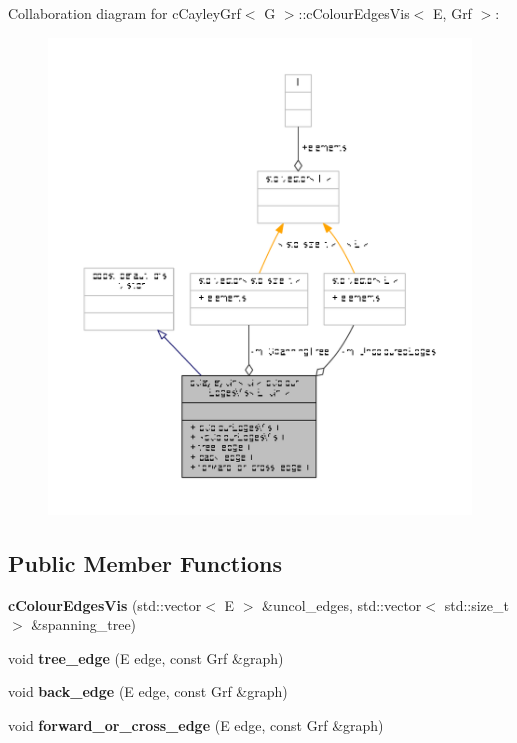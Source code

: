 Collaboration diagram for c\-Cayley\-Grf$<$ G $>$\-:\-:c\-Colour\-Edges\-Vis$<$ E, Grf $>$\-:
\nopagebreak
\begin{figure}[H]
\begin{center}
\leavevmode
\includegraphics[width=350pt]{classcCayleyGrf_1_1cColourEdgesVis__coll__graph}
\end{center}
\end{figure}
\subsection*{Public Member Functions}
\begin{DoxyCompactItemize}
\item 
\hypertarget{classcCayleyGrf_1_1cColourEdgesVis_a3a0757b2a0d975cdcd9f933eb6b11077}{{\bfseries c\-Colour\-Edges\-Vis} (std\-::vector$<$ E $>$ \&uncol\-\_\-edges, std\-::vector$<$ std\-::size\-\_\-t $>$ \&spanning\-\_\-tree)}\label{classcCayleyGrf_1_1cColourEdgesVis_a3a0757b2a0d975cdcd9f933eb6b11077}

\item 
\hypertarget{classcCayleyGrf_1_1cColourEdgesVis_a6943930a8499e2dc40c1ff8d389e6aa2}{void {\bfseries tree\-\_\-edge} (E edge, const Grf \&graph)}\label{classcCayleyGrf_1_1cColourEdgesVis_a6943930a8499e2dc40c1ff8d389e6aa2}

\item 
\hypertarget{classcCayleyGrf_1_1cColourEdgesVis_ae6eaab06b54e93abf2d32afa26202f54}{void {\bfseries back\-\_\-edge} (E edge, const Grf \&graph)}\label{classcCayleyGrf_1_1cColourEdgesVis_ae6eaab06b54e93abf2d32afa26202f54}

\item 
\hypertarget{classcCayleyGrf_1_1cColourEdgesVis_a3a5f071258d3482f9a1485c2b93690f1}{void {\bfseries forward\-\_\-or\-\_\-cross\-\_\-edge} (E edge, const Grf \&graph)}\label{classcCayleyGrf_1_1cColourEdgesVis_a3a5f071258d3482f9a1485c2b93690f1}

\end{DoxyCompactItemize}
